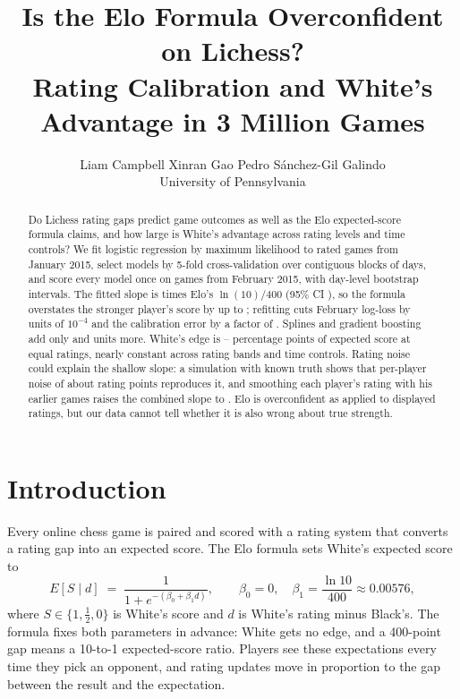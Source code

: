 \documentclass{article}
\title{Is the Elo Formula Overconfident on Lichess?\\Rating Calibration and White's Advantage in 3 Million Games}
\author{%
  Liam Campbell \And Xinran Gao \And Pedro S\'anchez-Gil Galindo \\
  University of Pennsylvania
}
\begin{document}
\maketitle

\begin{abstract}
Do Lichess rating gaps predict game outcomes as well as the Elo expected-score formula claims, and how large is White's advantage across rating levels and time controls? We fit logistic regression by maximum likelihood to \keptJan{} rated games from January 2015, select models by 5-fold cross-validation over contiguous blocks of days, and score every model once on \keptFeb{} games from February 2015, with day-level bootstrap intervals. The fitted slope is \slopeRatio{} times Elo's $\ln(10)/400$ (95\% CI \slopeRatioCI), so the formula overstates the stronger player's score by up to \maxEloMiss; refitting cuts February log-loss by \eloGain{} units of $10^{-4}$ and the calibration error by a factor of \calRatio. Splines and gradient boosting add only \splineGain{} and \gbmGain{} units more. White's edge is \bandAdvScoreMin--\bandAdvScoreMax{} percentage points of expected score at equal ratings, nearly constant across rating bands and time controls. Rating noise could explain the shallow slope: a simulation with known truth shows that per-player noise of about \simSigmaAll{} rating points reproduces it, and smoothing each player's rating with his earlier games raises the combined slope to \prevTwentySum. Elo is overconfident as applied to displayed ratings, but our data cannot tell whether it is also wrong about true strength.
\end{abstract}

\section{Introduction}
\label{sec:intro}

Every online chess game is paired and scored with a rating system that converts a rating gap into an expected score. The Elo formula \citep{elo1978} sets White's expected score to
\begin{equation}
  E[S \mid d] \;=\; \frac{1}{1 + e^{-(\beta_0 + \beta_1 d)}}, \qquad \beta_0 = 0, \quad \beta_1 = \frac{\ln 10}{400} \approx 0.00576,
  \label{eq:elo}
\end{equation}
where $S \in \{1, \tfrac12, 0\}$ is White's score and $d$ is White's rating minus Black's. The formula fixes both parameters in advance: White gets no edge, and a 400-point gap means a 10-to-1 expected-score ratio. Players see these expectations every time they pick an opponent, and rating updates move in proportion to the gap between the result and the expectation.
\end{document}

